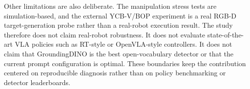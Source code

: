 Other limitations are also deliberate. The manipulation stress tests are simulation-based, and the external YCB-V/BOP experiment is a real RGB-D target-generation probe rather than a real-robot execution result. The study therefore does not claim real-robot robustness. It does not evaluate state-of-the-art VLA policies such as RT-style or OpenVLA-style controllers. It does not claim that GroundingDINO is the best open-vocabulary detector or that the current prompt configuration is optimal. These boundaries keep the contribution centered on reproducible diagnosis rather than on policy benchmarking or detector leaderboards.
